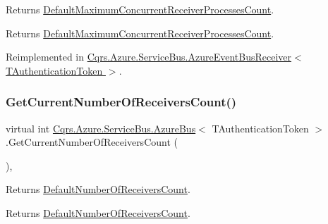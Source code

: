 Returns \hyperlink{classCqrs_1_1Azure_1_1ServiceBus_1_1AzureBus_a12c3d07b7ad1836e85a449e6adc8b5df_a12c3d07b7ad1836e85a449e6adc8b5df}{Default\+Maximum\+Concurrent\+Receiver\+Processes\+Count}. 

\begin{DoxyReturn}{Returns}
\hyperlink{classCqrs_1_1Azure_1_1ServiceBus_1_1AzureBus_a12c3d07b7ad1836e85a449e6adc8b5df_a12c3d07b7ad1836e85a449e6adc8b5df}{Default\+Maximum\+Concurrent\+Receiver\+Processes\+Count}.
\end{DoxyReturn}


Reimplemented in \hyperlink{classCqrs_1_1Azure_1_1ServiceBus_1_1AzureEventBusReceiver_a4c16501e26662fc8bc15613eeb3673d7_a4c16501e26662fc8bc15613eeb3673d7}{Cqrs.\+Azure.\+Service\+Bus.\+Azure\+Event\+Bus\+Receiver$<$ T\+Authentication\+Token $>$}.

\mbox{\label{classCqrs_1_1Azure_1_1ServiceBus_1_1AzureBus_a8489f49aa20b972411e12465baa1bd14_a8489f49aa20b972411e12465baa1bd14}} 
\subsubsection{\texorpdfstring{Get\+Current\+Number\+Of\+Receivers\+Count()}{GetCurrentNumberOfReceiversCount()}}
{\footnotesize\ttfamily virtual int \hyperlink{classCqrs_1_1Azure_1_1ServiceBus_1_1AzureBus}{Cqrs.\+Azure.\+Service\+Bus.\+Azure\+Bus}$<$ T\+Authentication\+Token $>$.Get\+Current\+Number\+Of\+Receivers\+Count (\begin{DoxyParamCaption}{ }\end{DoxyParamCaption})\hspace{0.3cm}{\ttfamily [protected]}, {\ttfamily [virtual]}}



Returns \hyperlink{classCqrs_1_1Azure_1_1ServiceBus_1_1AzureBus_a19642a14d6cf036cbbdb68b9ba7e635d_a19642a14d6cf036cbbdb68b9ba7e635d}{Default\+Number\+Of\+Receivers\+Count}. 

\begin{DoxyReturn}{Returns}
\hyperlink{classCqrs_1_1Azure_1_1ServiceBus_1_1AzureBus_a19642a14d6cf036cbbdb68b9ba7e635d_a19642a14d6cf036cbbdb68b9ba7e635d}{Default\+Number\+Of\+Receivers\+Count}.
\end{DoxyReturn}


